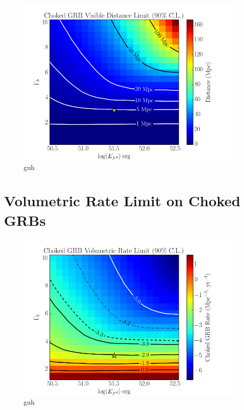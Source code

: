 \documentclass{gatech-thesis}
\begin{document}
\begin{figure}[ht]
  \begin{center}
    \includegraphics[width=1.0\textwidth,keepaspectratio]{DistanceLimit_2DHisto_WithContours_SysAdj.png}
  \end{center}
  \caption{guh}
  \label{fig:ParameterDepVisDist}
\end{figure}

\section{Volumetric Rate Limit on Choked GRBs}

\begin{figure}[ht]
  \begin{center}
    \includegraphics[width=1.0\textwidth,keepaspectratio]{RateLimit_2DHisto_wContours_SysAdj.png}
  \end{center}
  \caption{guh}
  \label{fig:ParameterDepRateLimit}
\end{figure}
\end{document}
